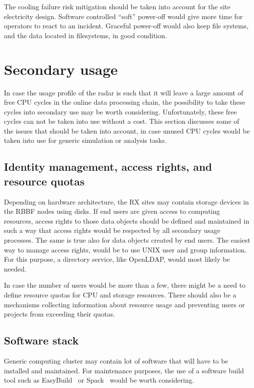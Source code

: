 \documentclass[12pt,a4paper]{article}
\begin{document}
The cooling failure risk mitigation should be
taken into account for the site electricity design.
Software controlled ``soft'' power-off would 
give more time for operators to react to an 
incident. 
Graceful power-off would also 
keep file systems, and the data located in filesystems, 
in good condition.

\section{Secondary usage}

In case the usage profile of the radar is such that
it will leave a large amount of free CPU cycles in the online data processing chain, the possibility to take these cycles into secondary use may be worth considering.
Unfortunately, these free cycles can not be taken into use without a cost. 
This section discusses some of the issues that should be taken into account, in case unused CPU cycles would be taken into use for generic simulation or analysis tasks.

\subsection{Identity management, access rights, and resource quotas}

Depending on hardware architecture, the RX sites may contain storage devices in the RBBF nodes using disks.
If end users are given access to computing resources, access rights to those data objects should be defined and maintained in such a way that access rights would be respected by all secondary usage processes.
The same is true also for data objects created by end users. The easiest way to manage access rights, would be to use UNIX user and group information. For this purpose, a directory service, like OpenLDAP, would most likely be needed. 

In case the number of users would be more than a few, there might be a need to define resource quotas for CPU and storage resources. 
There should also be a mechanisms collecting information about resource usage and preventing users or projects from exceeding their quotas.

\subsection{Software stack}

Generic computing cluster may contain lot of software that will have to be installed and maintained.  
For maintenance purposes, the use of a software build tool such as EasyBuild~\cite{easybuild}
or Spack~\cite{spack} would be worth considering. 
\end{document}
